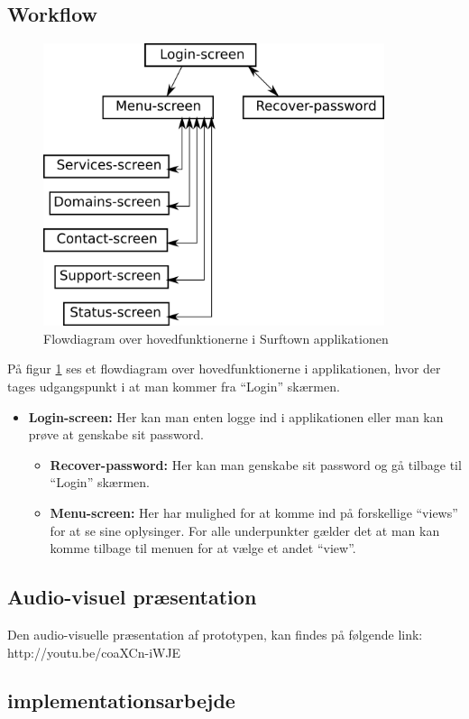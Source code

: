 \documentclass[12pt]{article}
\begin{document}
\subsection*{Workflow}
\begin{figure}[h]
	\includegraphics[width=10cm]{flow.png}
	\caption{Flowdiagram over hovedfunktionerne i Surftown applikationen}
	\label{flow}
\end{figure}
På figur \ref{flow} ses et flowdiagram over hovedfunktionerne i applikationen, hvor der tages udgangspunkt i at man kommer fra ``Login'' skærmen.
\begin{itemize}
	\item \textbf{Login-screen: } Her kan man enten logge ind i applikationen eller man kan prøve at genskabe sit password.
	\begin{itemize}
		\item \textbf{Recover-password: } Her kan man genskabe sit password og gå tilbage til ``Login'' skærmen.
		\item \textbf{Menu-screen: } Her har mulighed for at komme ind på forskellige ``views'' for at se sine oplysinger. For alle underpunkter gælder det at man kan komme tilbage til menuen for at vælge et andet ``view''.	
	\end{itemize}
\end{itemize}
\subsection{Audio-visuel præsentation}
Den audio-visuelle præsentation af prototypen, kan findes på følgende link: http://youtu.be/coaXCn-iWJE

\subsection{implementationsarbejde}
\end{document}
